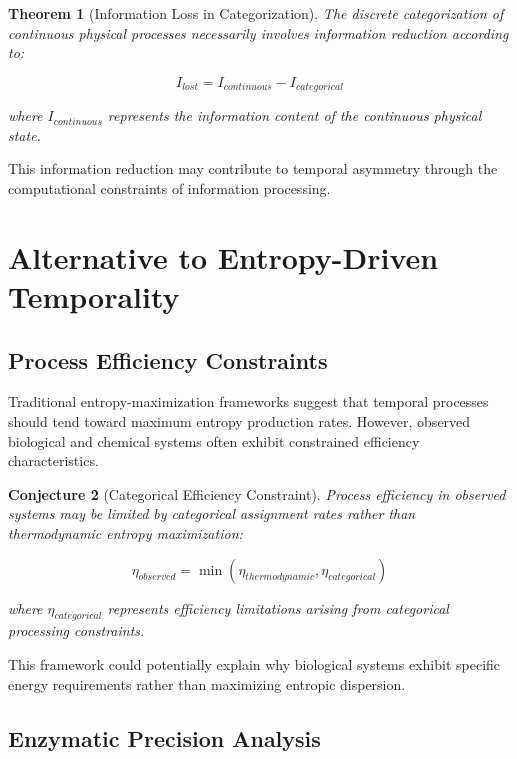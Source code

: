 \documentclass[12pt,a4paper]{article}
\newtheorem{theorem}{Theorem}[section]
\newtheorem{conjecture}[theorem]{Conjecture}
\theoremstyle{remark}
\begin{document}
\begin{theorem}[Information Loss in Categorization]
The discrete categorization of continuous physical processes necessarily involves information reduction according to:

\begin{equation}
I_{lost} = I_{continuous} - I_{categorical}
\end{equation}

where $I_{continuous}$ represents the information content of the continuous physical state.
\end{theorem}

This information reduction may contribute to temporal asymmetry through the computational constraints of information processing.

\section{Alternative to Entropy-Driven Temporality}

\subsection{Process Efficiency Constraints}

Traditional entropy-maximization frameworks suggest that temporal processes should tend toward maximum entropy production rates. However, observed biological and chemical systems often exhibit constrained efficiency characteristics.

\begin{conjecture}[Categorical Efficiency Constraint]
Process efficiency in observed systems may be limited by categorical assignment rates rather than thermodynamic entropy maximization:

\begin{equation}
\eta_{observed} = \min\left(\eta_{thermodynamic}, \eta_{categorical}\right)
\end{equation}

where $\eta_{categorical}$ represents efficiency limitations arising from categorical processing constraints.
\end{conjecture}

This framework could potentially explain why biological systems exhibit specific energy requirements rather than maximizing entropic dispersion.

\subsection{Enzymatic Precision Analysis}
\end{document}
